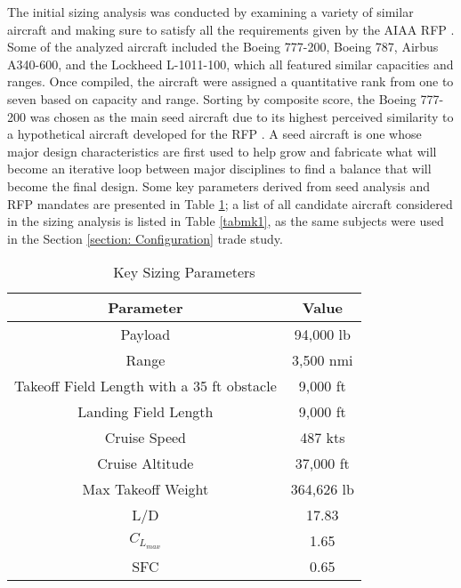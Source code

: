 The initial sizing analysis was conducted by examining a variety of similar aircraft and making sure to satisfy all the requirements given by the AIAA RFP \cite{RFP}. Some of the analyzed aircraft included the Boeing 777-200, Boeing 787, Airbus A340-600, and the Lockheed L-1011-100, which all featured similar capacities and ranges. Once compiled, the aircraft were assigned a quantitative rank from one to seven based on  capacity and range. Sorting by composite score, the Boeing 777-200 was chosen as the main seed aircraft due to its highest perceived similarity to a hypothetical aircraft developed for the RFP \cite{RFP}. A seed aircraft is one whose major design characteristics are first used to help grow and fabricate what will become an iterative loop between major disciplines to find a balance that will become the final design.  Some key parameters derived from seed analysis and RFP mandates are presented in Table \ref{tab:req}; a list of all candidate aircraft considered in the sizing analysis is listed in Table \ref{tabmk1}, as the same subjects were used in the Section \ref{section: Configuration} trade study.

\begin{table}[h!] 
    \centering
    \caption{Key Sizing Parameters}
    \begin{tabular}{ |c||c| }\toprule
    \textbf{Parameter} & \textbf{Value} \\\hline\hline
    Payload & 94,000 lb  \\\hline
    Range & 3,500 nmi \\\hline
    Takeoff Field Length with a 35 ft obstacle & 9,000 ft  \\\hline
    Landing Field Length & 9,000 ft \\\hline
    Cruise Speed & 487 kts\\\hline
    Cruise Altitude & 37,000 ft \\\hline
    Max Takeoff Weight & 364,626 lb\\\hline 
    L/D & 17.83\\\hline 
    $C_{L_{max}}$ & 1.65\\\hline 
    SFC & 0.65\\\hline 

    \end{tabular}\label{tab:req}
\end{table}

